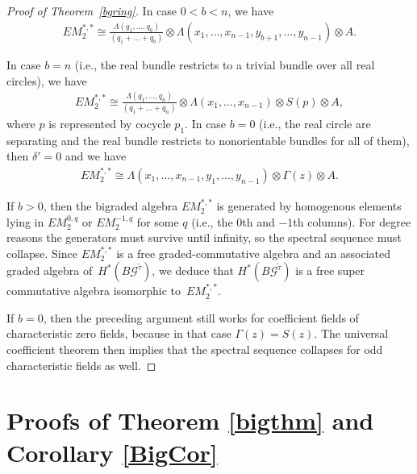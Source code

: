 \documentclass[10pt,a4paper]{amsart}
\numberwithin{equation}{section}
\begin{document}
\begin{proof}[Proof of Theorem~\ref{bgring}]
In case $0<b<n$, we have \begin{gather*}EM_2^{*,*} \cong \frac{\Lambda(q_1,\dots,q_b)}{(q_1+\dots+q_b)} \otimes \Lambda(x_1,\dots,x_{n-1},y_{b+1},\dots,y_{n-1}) \otimes A.\end{gather*}

In case $b=n$ (i.e., the real bundle restricts to a trivial bundle over all real circles), we have
\begin{gather*} EM_2^{*,*} \cong \frac{\Lambda(q_1,\dots,q_n)}{(q_1+\dots+q_n)} \otimes \Lambda(x_1,\dots,x_{n-1})\otimes S(p) \otimes A, \end{gather*}
where $p$ is represented by cocycle $p_1$.
In case $b=0$ (i.e., the real circle are separating and the real bundle restricts to nonorientable bundles for all of them), then $\delta' =0$ and we have
 \begin{gather*}EM_2^{*,*} \cong \Lambda(x_1,\dots,x_{n-1},y_{1},\dots,y_{n-1}) \otimes \Gamma(z) \otimes A.\end{gather*}

If $b>0$, then the bigraded algebra $EM_2^{*,*}$ is generated by homogenous elements lying in $EM_2^{0,q}$ or $EM_2^{-1,q}$ for some $q$ (i.e., the $0$th and $-1$th columns). For degree reasons the generators must survive until inf\/inity, so the spectral sequence must collapse. Since $EM_2^{*,*}$ is a free graded-commutative algebra and an associated graded algebra of~$H^*(B{\mathcal G}^{\tilde{\tau}})$, we deduce that $H^*(B{\mathcal G}^{\tilde{\tau}})$ is a free super commutative algebra isomorphic to~$EM_2^{*,*}$.

If $b=0$, then the preceding argument still works for coef\/f\/icient f\/ields of characteristic zero f\/ields, because in that case $\Gamma(z) = S(z)$. The universal coef\/f\/icient theorem then implies that the spectral sequence collapses for odd characteristic f\/ields as well.
\end{proof}

\section{Proofs of Theorem \ref{bigthm} and Corollary \ref{BigCor}}
\end{document}
